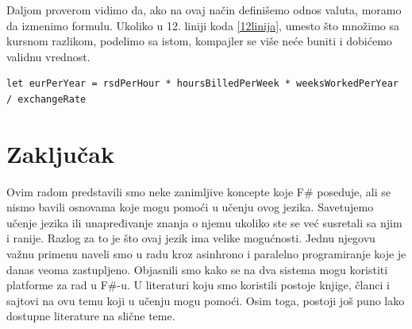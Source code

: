 \documentclass[a4paper]{article}
\begin{document}
Daljom proverom vidimo da, ako na ovaj način definišemo odnos valuta, moramo da izmenimo formulu. Ukoliko u 12. liniji koda \ref{12linija}, umesto što množimo sa kursnom razlikom, podelimo sa istom, kompajler se više neće buniti i dobićemo validnu vrednost. \\

\begin{lstlisting}[caption={Ispravljena linija},frame=single, firstnumber=12,label={12linija}]
let eurPerYear = rsdPerHour * hoursBilledPerWeek * weeksWorkedPerYear / exchangeRate
\end{lstlisting}

\section{Zaključak}
\label{sec:zakljucak}

Ovim radom predstavili smo neke zanimljive koncepte koje F\# poseduje, ali se nismo bavili osnovama koje mogu pomoći u učenju ovog jezika. Savetujemo učenje jezika ili unapređivanje znanja o njemu ukoliko ste se već susretali sa njim i ranije. Razlog za to je što ovaj jezik ima velike mogućnosti. Jednu njegovu važnu primenu naveli smo u radu kroz asinhrono i paralelno programiranje koje je danas veoma zastupljeno. Objasnili smo kako se na dva sistema mogu koristiti platforme za rad u F\#-u. U literaturi koju smo koristili postoje knjige, članci i sajtovi na ovu temu koji u učenju mogu pomoći. Osim toga, postoji još puno lako dostupne literature na slične teme.

\appendix
 

\end{document}
